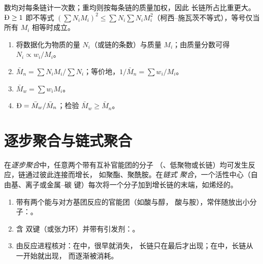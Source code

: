 数均对每条链计一次数；重均则按每条链的质量加权，因此
长链所占比重更大。$\text{\DH} \ge 1$ 即不等式 $\left(\sum N_i M_i\right)^2 \le
\sum N_i \sum N_i M_i^2$（柯西–施瓦茨不等式），等号仅当所有 $M_i$ 相等时成立。

\begin{method}[计算平均值]\label{met:b2:polymer-synthesis:averages}
\begin{enumerate}
  \item 将数据化为物质的量 $N_i$（或链的条数）与质量 $M_i$；由质量分数可得
        $N_i \propto w_i/M_i$。
  \item $\bar M_n = \sum N_i M_i / \sum N_i$；等价地，$1/\bar M_n = \sum w_i/M_i$。
  \item $\bar M_w = \sum w_i M_i$。
  \item $\text{\DH} = \bar M_w/\bar M_n$；检验 $\bar M_w \ge \bar M_n$。
\end{enumerate}
\end{method}

\section{逐步聚合与链式聚合}

\begin{definition}[逐步聚合与链式聚合]\label{def:b2:polymer-synthesis:step-chain}
在\emph{逐步聚合}中，任意两个带有互补官能团的分子
（、低聚物或长链）均可发生反应，链通过彼此连接而增长，
如聚酯、聚酰胺。在\emph{链式
聚合}，一个活性中心（自由基、离子或金属–碳
键）每次将一个分子加到增长链的末端，如烯烃的。
\end{definition}

\begin{method}[逐步还是链式？]\label{met:b2:polymer-synthesis:classify}
\begin{enumerate}
  \item {}带有两个能与对方基团反应的官能团（如酸与醇，
        酸与胺），常伴随放出小分子：。
  \item {}含  双键（或张力环）并带有引发剂：。
  \item 由反应进程核对：在中，很早就消失，
        长链只在最后才出现；在中，长链从一开始就出现，
        而逐渐被消耗。
\end{enumerate}
\end{method}

